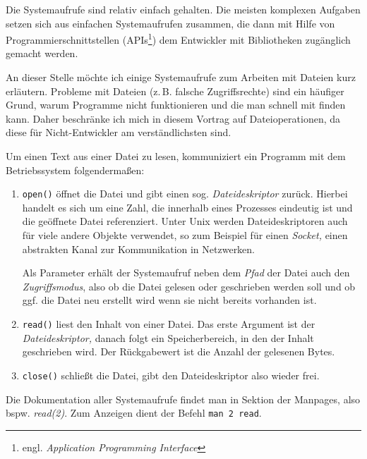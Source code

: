 \documentclass[10pt,DIV=15,twocolumn,ngerman,parskip=half]{scrartcl}
\begin{document}
Die Systemaufrufe sind relativ einfach gehalten. Die meisten komplexen Aufgaben setzen sich aus
einfachen Systemaufrufen zusammen, die dann mit Hilfe von Programmierschnittstellen (APIs\footnote{
engl. \emph{Application Programming Interface}}) dem Entwickler mit Bibliotheken zugänglich gemacht
werden.


An dieser Stelle möchte ich einige Systemaufrufe zum Arbeiten mit Dateien kurz erläutern. Probleme
mit Dateien (z.\,B. falsche Zugriffsrechte) sind ein häufiger Grund, warum Programme nicht
funktionieren und die man schnell mit \strace{} finden kann. Daher beschränke ich mich in diesem
Vortrag auf Dateioperationen, da diese für Nicht-Entwickler am verständlichsten sind.

Um einen Text aus einer Datei zu lesen, kommuniziert ein Programm mit dem Betriebssystem
folgendermaßen:

\begin{enumerate}
  \item \texttt{open()} öffnet die Datei und gibt einen sog. \emph{Dateideskriptor} zurück. Hierbei
   handelt es sich um eine Zahl, die innerhalb eines Prozesses eindeutig ist und die geöffnete
   Datei referenziert. Unter Unix werden Dateideskriptoren auch für viele andere Objekte verwendet, 
   so zum Beispiel für einen \emph{Socket,} einen abstrakten Kanal zur Kommunikation in Netzwerken.

   Als Parameter erhält der Systemaufruf neben dem \emph{Pfad} der Datei auch den 
   \emph{Zugriffsmodus}, also ob die Datei gelesen oder geschrieben werden soll und ob ggf. die 
   Datei neu erstellt wird wenn sie nicht bereits vorhanden ist.

  \item \texttt{read()} liest den Inhalt von einer Datei. Das erste Argument ist der
   \emph{Dateideskriptor,} danach folgt ein Speicherbereich, in den der Inhalt geschrieben wird.
   Der Rückgabewert ist die Anzahl der gelesenen Bytes.

  \item \texttt{close()} schließt die Datei, gibt den Dateideskriptor also wieder frei.
\end{enumerate}

Die Dokumentation aller Systemaufrufe findet man in Sektion der Manpages, also bspw.
\emph{read(2)}. Zum Anzeigen dient der Befehl \texttt{man 2 read}.

    
\end{document}

